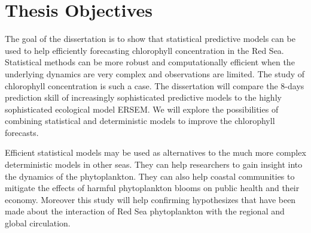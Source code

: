 \section{Thesis Objectives}

The goal of the dissertation is to show that statistical predictive models can be used to help efficiently forecasting chlorophyll concentration in the Red Sea. Statistical methods can be more robust and computationally efficient when the underlying dynamics are very complex and observations are limited. The study of chlorophyll concentration is such a case. The dissertation will compare the 8-days prediction skill of increasingly sophisticated predictive models to the highly sophisticated ecological model ERSEM. We will explore the possibilities of combining statistical and deterministic models to improve the chlorophyll forecasts.

Efficient statistical models may be used as alternatives to the much more complex deterministic models in other seas. They can help researchers to gain insight into the dynamics of the phytoplankton. They can also help coastal communities to mitigate the effects of harmful phytoplankton blooms on public health and their economy. Moreover this study will help confirming hypothesizes that have been made about the interaction of Red Sea phytoplankton with the regional and global circulation. 


